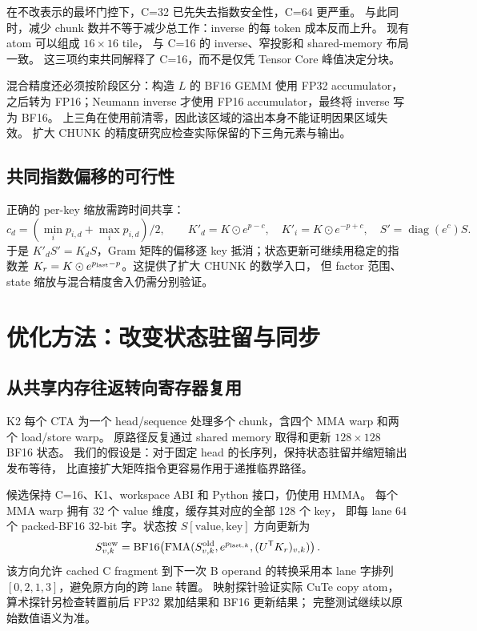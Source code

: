 \documentclass[11pt,a4paper,fontset=none]{ctexart}
\newcommand{\code}[1]{\texttt{\detokenize{#1}}}
\begin{document}
在不改表示的最坏门控下，C=32 已先失去指数安全性，C=64 更严重。
与此同时，减少 chunk 数并不等于减少总工作：inverse 的每 token 成本反而上升。
现有 \code{SM80_16x8x16} atom 可以组成 \(16\times16\) tile，
与 C=16 的 inverse、窄投影和 shared-memory 布局一致。
这三项约束共同解释了 C=16，而不是仅凭 Tensor Core 峰值决定分块。

混合精度还必须按阶段区分：构造 \(L\) 的 BF16 GEMM 使用 FP32 accumulator，
之后转为 FP16；Neumann inverse 才使用 FP16 accumulator，最终将 inverse 写为 BF16。
上三角在使用前清零，因此该区域的溢出本身不能证明因果区域失效。
扩大 CHUNK 的精度研究应检查实际保留的下三角元素与输出。

\subsection{共同指数偏移的可行性}
正确的 per-key 缩放需跨时间共享：
\[
 c_d=(\min_i p_{i,d}+\max_i p_{i,d})/2,\qquad
 K'_d=K\odot e^{p-c},\quad K'_i=K\odot e^{-p+c},\quad
 S'=\operatorname{diag}(e^c)S.
\]
于是 \(K'_dS'=K_dS\)，Gram 矩阵的偏移逐 key 抵消；状态更新可继续用稳定的指数差
\(K_r=K\odot e^{p_{\rm last}-p}\)。这提供了扩大 CHUNK 的数学入口，
但 factor 范围、state 缩放与混合精度舍入仍需分别验证。


\section{优化方法：改变状态驻留与同步}
\subsection{从共享内存往返转向寄存器复用}
K2 每个 CTA 为一个 head/sequence 处理多个 chunk，含四个 MMA warp 和两个 load/store warp。
原路径反复通过 shared memory 取得和更新 \(128\times128\) BF16 状态。
我们的假设是：对于固定 head 的长序列，保持状态驻留并缩短输出发布等待，
比直接扩大矩阵指令更容易作用于递推临界路径。

候选保持 C=16、K1、workspace ABI 和 Python 接口，仍使用 HMMA。
每个 MMA warp 拥有 32 个 value 维度，缓存其对应的全部 128 个 key，
即每 lane 64 个 packed-BF16 32-bit 字。状态按
\(S[\mathrm{value},\mathrm{key}]\) 方向更新为
\[
 S_{v,k}^{\rm new}=
 \operatorname{BF16}\!\left(
  \operatorname{FMA}(S_{v,k}^{\rm old},e^{p_{{\rm last},k}},
                    (U^{\mathsf T}K_r)_{v,k})\right).
\]
该方向允许 cached C fragment 到下一次 B operand 的转换采用本 lane 字排列
\([0,2,1,3]\)，避免原方向的跨 lane 转置。
映射探针验证实际 CuTe copy atom，算术探针另检查转置前后 FP32 累加结果和 BF16 更新结果；
完整测试继续以原始数值语义为准。
\end{document}
